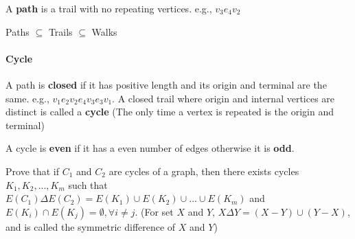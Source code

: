                 \begin{definition}[path]
                    A \textbf{path} is a trail with no repeating vertices. e.g., $v_3e_4v_2$
                \end{definition}

                Paths $\subseteq$ Trails $\subseteq$ Walks

            \paragraph{Cycle}
                \begin{definition}
                    A path is \textbf{closed} if it has positive length and its origin and terminal are the same. e.g., $v_1e_2v_2e_4v_3e_3v_1$. A closed trail where origin and internal vertices are distinct is called a \textbf{cycle} (The only time a vertex is repeated is the origin and terminal)
                \end{definition}

                \begin{definition}
                    A cycle is \textbf{even} if it has a even number of edges otherwise it is \textbf{odd}.
                \end{definition}

                \begin{problem}
                    Prove that if $C_1$ and $C_2$ are cycles of a graph, then there exists cycles $K_1, K_2, ..., K_m$ such that $E(C_1)\Delta E(C_2) = E(K_1)\cup E(K_2) \cup...\cup E(K_m)$ and $E(K_i)\cap E(K_j)=\emptyset, \forall i \neq j$. (For set $X$ and $Y$, $X\Delta Y = (X-Y)\cup(Y-X)$, and is called the symmetric difference of $X$ and $Y$)
                \end{problem}

